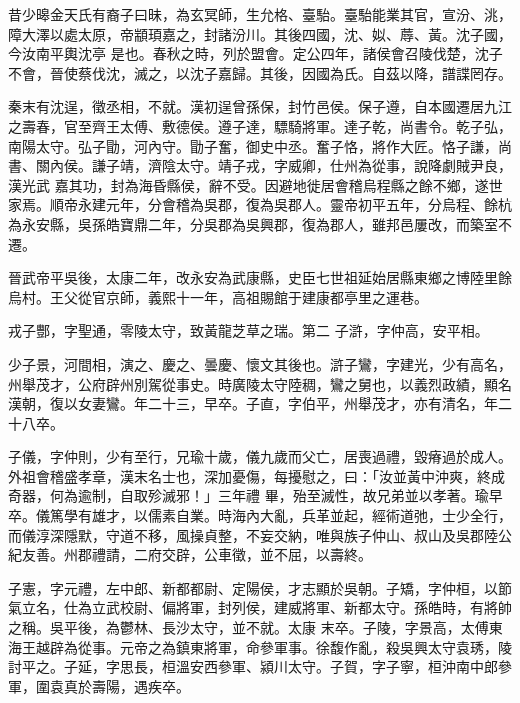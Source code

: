 
\begin{pinyinscope}

 昔少暤金天氏有裔子曰昧，為玄冥師，生允格、臺駘。臺駘能業其官，宣汾、洮，障大澤以處太原，帝顓頊嘉之，封諸汾川。其後四國，沈、姒、蓐、黃。沈子國，今汝南平輿沈亭
 是也。春秋之時，列於盟會。定公四年，諸侯會召陵伐楚，沈子不會，晉使蔡伐沈，滅之，以沈子嘉歸。其後，因國為氏。自茲以降，譜諜罔存。



 秦末有沈逞，徵丞相，不就。漢初逞曾孫保，封竹邑侯。保子遵，自本國遷居九江之壽春，官至齊王太傅、敷德侯。遵子達，驃騎將軍。達子乾，尚書令。乾子弘，南陽太守。弘子勖，河內守。勖子奮，御史中丞。奮子恪，將作大匠。恪子謙，尚書、關內侯。謙子靖，濟陰太守。靖子戎，字威卿，仕州為從事，說降劇賊尹良，漢光武
 嘉其功，封為海昏縣侯，辭不受。因避地徙居會稽烏程縣之餘不鄉，遂世家焉。順帝永建元年，分會稽為吳郡，復為吳郡人。靈帝初平五年，分烏程、餘杭為永安縣，吳孫皓寶鼎二年，分吳郡為吳興郡，復為郡人，雖邦邑屢改，而築室不遷。



 晉武帝平吳後，太康二年，改永安為武康縣，史臣七世祖延始居縣東鄉之博陸里餘烏村。王父從官京師，義熙十一年，高祖賜館于建康都亭里之運巷。



 戎子酆，字聖通，零陵太守，致黃龍芝草之瑞。第二
 子滸，字仲高，安平相。



 少子景，河間相，演之、慶之、曇慶、懷文其後也。滸子鸞，字建光，少有高名，州舉茂才，公府辟州別駕從事史。時廣陵太守陸稠，鸞之舅也，以義烈政績，顯名漢朝，復以女妻鸞。年二十三，早卒。子直，字伯平，州舉茂才，亦有清名，年二十八卒。



 子儀，字仲則，少有至行，兄瑜十歲，儀九歲而父亡，居喪過禮，毀瘠過於成人。外祖會稽盛孝章，漢末名士也，深加憂傷，每擾慰之，曰：「汝並黃中沖爽，終成奇器，何為逾制，自取殄滅邪！」三年禮
 畢，殆至滅性，故兄弟並以孝著。瑜早卒。儀篤學有雄才，以儒素自業。時海內大亂，兵革並起，經術道弛，士少全行，而儀淳深隱默，守道不移，風操貞整，不妄交納，唯與族子仲山、叔山及吳郡陸公紀友善。州郡禮請，二府交辟，公車徵，並不屈，以壽終。



 子憲，字元禮，左中郎、新都都尉、定陽侯，才志顯於吳朝。子矯，字仲桓，以節氣立名，仕為立武校尉、偏將軍，封列侯，建威將軍、新都太守。孫皓時，有將帥之稱。吳平後，為鬱林、長沙太守，並不就。太康
 末卒。子陵，字景高，太傅東海王越辟為從事。元帝之為鎮東將軍，命參軍事。徐馥作亂，殺吳興太守袁琇，陵討平之。子延，字思長，桓溫安西參軍、潁川太守。子賀，字子寧，桓沖南中郎參軍，圍袁真於壽陽，遇疾卒。




\end{pinyinscope}
